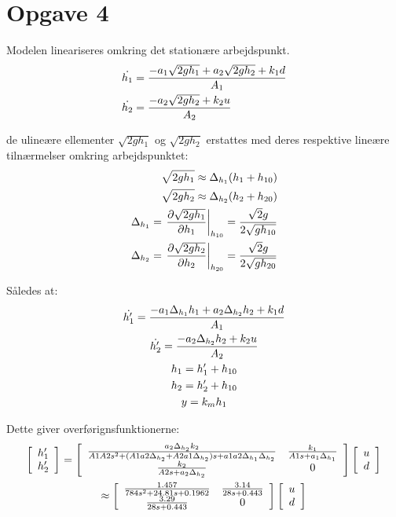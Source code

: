 \section{Opgave 4}
Modelen lineariseres omkring det stationære arbejdspunkt.
\begin{align*}
\dot{h_1} &= \frac{-a_1\sqrt{2gh_1} + a_2\sqrt{2gh_2} + k_1d}{A_1}\\
\dot{h_2} &= \frac{-a_2\sqrt{2gh_2} + k_2u}{A_2}\\
\end{align*}

de ulineære ellementer $\sqrt{2gh_1}$ og $\sqrt{2gh_2}$ erstattes med deres
respektive lineære tilnærmelser omkring arbejdspunktet:
\begin{align*}
\sqrt{2gh_1} \approx \Delta_{h_1}(h_1 + h_{10})\\
\sqrt{2gh_2} \approx \Delta_{h_2}(h_2 + h_{20})\\
\Delta_{h_1} = \left.\frac{\partial {\sqrt{2gh_1}}}{\partial {h_1}}\right|_{h_{10}}
 = \frac{\sqrt{2}g}{2\sqrt{gh_{10}}}\\
\Delta_{h_2} = \left.\frac{\partial {\sqrt{2gh_2}}}{\partial {h_2}}\right|_{h_{20}}
 = \frac{\sqrt{2}g}{2\sqrt{gh_{20}}}
\end{align*}

Således at:
\begin{gather*}
\dot{h'_1} = \frac{-a_1\Delta_{h_1}h_1 + a_2\Delta_{h_2}h_2
+ k_1d}{A_1}\\
\dot{h'_2} = \frac{-a_2\Delta_{h_2}h_2 + k_2u}{A_2}\\
h_1 = h'_1 + h_{10}\\
h_2 = h'_2 + h_{10}\\
y = k_m h_1
\end{gather*}

Dette giver overførignsfunktionerne:
\begin{gather*}
\matrix{c}{}{}{ h'_1 \\ h'_2 } =
\matrix{c c}{}{}{
\frac{ a_2 \Delta_{h_2} k_2 }
	{ A1A2s^2
	+ ( A1 a2 \Delta_{h_2} + A2 a1 \Delta_{h_2} ) s
	+ a1 a2 \Delta_{h_1} \Delta_{h_2} } &
\frac{k_1}{ A1 s + a_1 \Delta_{h_1} } \\
\frac{k_2}{ A2 s + a_2 \Delta_{h_2} } &
0
}
\matrix{c}{}{}{ u \\ d }\\
\approx \matrix{c c}{}{}{
 \frac{1.457}{784 s^2 + 24.81 s + 0.1962} &
 \frac{3.14}{28s + 0.443} \\
\frac{3.29}{28s + 0.443} &
0 
}
\matrix{c}{}{}{ u \\ d }
\end{gather*}

